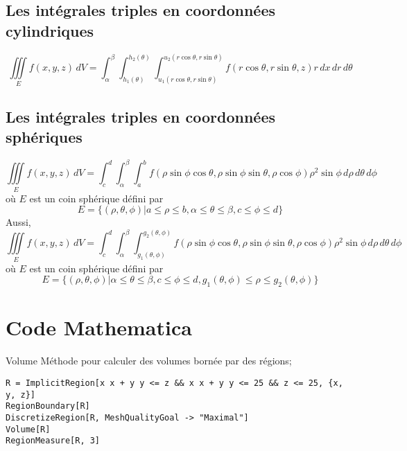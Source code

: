 	\subsection{Les intégrales triples en coordonnées cylindriques}
		\begin{mydef}
		\[\iiint\limits_E f(x,y,z)\, dV =\int_{\alpha}^{\beta}\int_{h_1(\theta)}^{h_2(\theta)}\int_{u_1(r\cos\theta,r\sin\theta)}^{u_2(r\cos\theta,r\sin\theta)}f(r\cos\theta,r\sin\theta,z)r\, dx\, dr\, d\theta\]
	\end{mydef}
	\subsection{Les intégrales triples en coordonnées sphériques}
		\begin{mydef}
	\[\iiint\limits_E f(x,y,z)\, dV=\int_c^d\int_{\alpha}^{\beta}\int_a^b f(\rho\sin\phi\cos\theta,\rho\sin\phi\sin\theta,\rho\cos\phi)\rho^2\sin\phi\, d\rho\, d\theta\, d\phi \] où $E$ est un coin sphérique défini par
	\[E=\big\{ (\rho,\theta,\phi) \lvert a\leq \rho \leq b, \alpha\leq \theta\leq \beta, c\leq\phi\leq d\big\}\]
	Aussi,
	\[\iiint\limits_E f(x,y,z)\, dV=\int_c^d\int_{\alpha}^{\beta}\int_{g_1(\theta,\phi)}^{g_2(\theta,\phi)} f(\rho\sin\phi\cos\theta,\rho\sin\phi\sin\theta,\rho\cos\phi)\rho^2\sin\phi\, d\rho\, d\theta\, d\phi \] où $E$ est un coin sphérique défini par
	\[E=\big\{ (\rho,\theta,\phi) \lvert \alpha\leq\theta\leq\beta, c\leq\phi\leq d, g_1(\theta,\phi)\leq\rho\leq g_2(\theta,\phi) \big\}\]
	
\end{mydef}
\section{Code Mathematica}
\begin{code}{Volume}
	Méthode pour calculer des volumes bornée par des régions\hfill ;
	\begin{flushleft}
	\verb|R = ImplicitRegion[x x + y y <= z && x x + y y <= 25 && z <= 25, {x, y, z}]|\\
	\verb|RegionBoundary[R]|\\
	\verb|DiscretizeRegion[R, MeshQualityGoal -> "Maximal"]|\\
	\verb|Volume[R]|\\
	\verb|RegionMeasure[R, 3]|
	\end{flushleft}
\end{code}
